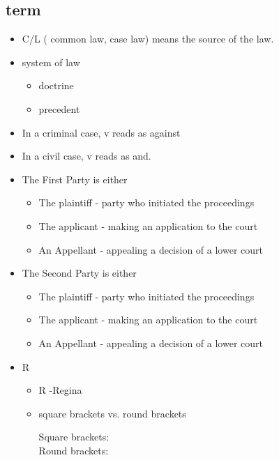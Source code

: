 \subsection{term}
\begin{itemize}
    \item C/L ( common law, case law) means the source of the law.
    \item system of law 
        \begin{itemize}
            \item doctrine
            \item precedent
        \end{itemize}
    \item In a criminal case, v reads as against
    \item In a civil case, v reads as and.
    \item The First Party is either
        \begin{itemize}
            \item The plaintiff - party who initiated the proceedings
            \item The applicant - making an application to the court
            \item An Appellant - appealing a decision of a lower court
        \end{itemize}
    \item The Second Party is either
        \begin{itemize}
            \item The plaintiff - party who initiated the proceedings
            \item The applicant - making an application to the court
            \item An Appellant - appealing a decision of a lower court
        \end{itemize}
    \item R
        \begin{itemize}
            \item R -Regina
            \item square brackets vs. round brackets 
            \begin{description}
                \item[Square brackets:]
                \item[Round brackets: ]
            \end{description}
        \end{itemize}
\end{itemize}



